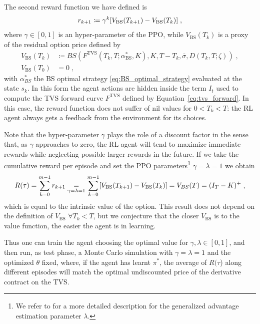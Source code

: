 \documentclass[runningheads]{m2ef}
\newcommand\soutpars[1]{\let\helpcmd\sout\parhelp#1\par\relax\relax}
\newcommand{\change}[1]{{\color{red} {#1}}}%
\newcommand{\remove}[1]{{\color{red} \soutpars{{#1}}}}%
\begin{document}
The second reward function we have defined is 
\begin{equation}
 	r_{k+1} \coloneqq  \gamma^{k}[V_{\text{BS}}(T_{k+1})-V_\text{\text{BS}}(T_k)] \; ,
 \label{eq:reward2}\end{equation}
where $\gamma \in[0,1]$ is an hyper-parameter of the PPO, while $V_{\text{BS}}(T_k)$ is a proxy of the residual option price defined by
\begin{equation}
\begin{aligned}
	V_{\text{BS}}(T_k) &\coloneqq BS(F^{\text{TVS}}(T_k,T;\alpha^*_{\text{BS}},K),K,T-T_k,\bar{\sigma},D(T_k,T;\zeta)) \; ,\\
	V_{\text{BS}}(T_0)&=0 \; , 
\end{aligned}
\end{equation} 
with $\alpha^*_{BS}$ the BS optimal strategy \eqref{eq:BS_optimal_strategy} evaluated at the state $s_k$. In this form the agent actions are hidden inside the term $I_t$ used to compute the TVS forward curve $F^{\text{TVS}}$ defined by Equation~\eqref{eq:tvs_forward}. In this case, the reward function does not suffer of nil values for $0<T_k<T$: the RL agent always gets a feedback from the environment for its choices.  \remove{The} \change{Note that the} hyper-parameter $\gamma$ plays the role of a discount factor in the sense that, as $\gamma$ approaches to zero, the RL agent will tend to maximize immediate rewards while neglecting possible larger rewards in the future.
If we take the cumulative reward per episode and set the PPO parameters\footnote{We refer to \cite{Schulman2016} for a more detailed description for the generalized advantage estimation parameter $\lambda$.} $\gamma =\lambda =1$ we obtain
\begin{equation}
	R(\tau) = \sum_{k=0}^{m-1} r_{k+1} \underset{\gamma=\lambda =1}{=} \sum_{k=0}^{m-1}[V_{\text{BS}}(T_{k+1})-V_\text{\text{BS}}(T_k)] = V_{BS}(T) = (I_T-K)^+ \; ,
\end{equation} 
which is equal to the intrinsic value of the option. This result does not depend on the definition of $V_{\text{BS}}$  $\forall T_k<T$, but we conjecture that the closer $V_{\text{BS}}$ is to the value function, the easier the agent is in learning.

Thus one can train the agent choosing the optimal value for $\gamma,\lambda\in[0,1]$, and then run, as test phase, a Monte Carlo simulation with $\gamma=\lambda=1$ and the optimized $\theta$ fixed, where, if the agent has learnt $\pi^*$, the average of $R(\tau$) along different episodes will match the optimal undiscounted price of the derivative contract on the TVS.  
 
\end{document}
